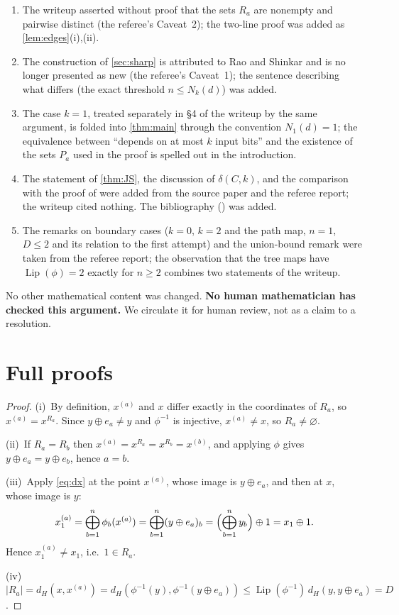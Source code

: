 \documentclass[11pt,a4paper]{article}
\theoremstyle{plain}
\theoremstyle{definition}
\theoremstyle{remark}
\newcommand{\dH}{d_H}
\newcommand{\Lip}{\operatorname{Lip}}
\begin{document}
\begin{enumerate}[label=(\alph*),nosep]
\item The writeup asserted without proof that the sets $R_a$ are nonempty and pairwise distinct (the referee's Caveat~2); the two-line proof was added as \cref{lem:edges}(i),(ii).
\item The construction of \cref{sec:sharp} is attributed to Rao and Shinkar \cite[Theorem~2 and Appendix~A]{RS18} and is no longer presented as new (the referee's Caveat~1); the sentence describing what differs (the exact threshold $n\le N_k(d)$) was added.
\item The case $k=1$, treated separately in \S4 of the writeup by the same argument, is folded into \cref{thm:main} through the convention $N_1(d)=1$; the equivalence between ``depends on at most $k$ input bits'' and the existence of the sets $P_a$ used in the proof is spelled out in the introduction.
\item The statement of \cref{thm:JS}, the discussion of $\delta(C,k)$, and the comparison with the proof of \cite{JS21} were added from the source paper and the referee report; the writeup cited nothing. The bibliography (\cite{JS21,RS18,Joh21,BS23}) was added.
\item The remarks on boundary cases ($k=0$, $k=2$ and the path map, $n=1$, $D\le2$ and its relation to the first attempt) and the union-bound remark were taken from the referee report; the observation that the tree maps have $\Lip(\phi)=2$ exactly for $n\ge2$ combines two statements of the writeup.
\end{enumerate}
No other mathematical content was changed.
\textbf{No human mathematician has checked this argument.} We circulate it for human review, not as a claim to a resolution.

\appendix

\section{Full proofs}\label{app:proofs}

\label{pf:edges}
\lemedges*
\begin{proof}
(i)~By definition, $x^{(a)}$ and $x$ differ exactly in the coordinates of $R_a$, so $x^{(a)}=x^{R_a}$. Since $y\oplus e_a\ne y$ and $\phi^{-1}$ is injective, $x^{(a)}\ne x$, so $R_a\ne\varnothing$.

(ii)~If $R_a=R_b$ then $x^{(a)}=x^{R_a}=x^{R_b}=x^{(b)}$, and applying $\phi$ gives $y\oplus e_a=y\oplus e_b$, hence $a=b$.

(iii)~Apply \eqref{eq:dx} at the point $x^{(a)}$, whose image is $y\oplus e_a$, and then at $x$, whose image is $y$:
\[
x^{(a)}_1=\bigoplus_{b=1}^n\phi_b(x^{(a)})=\bigoplus_{b=1}^n(y\oplus e_a)_b=\Bigl(\bigoplus_{b=1}^n y_b\Bigr)\oplus1=x_1\oplus1 .
\]
Hence $x^{(a)}_1\ne x_1$, i.e.\ $1\in R_a$.

(iv)~$|R_a|=\dH(x,x^{(a)})=\dH(\phi^{-1}(y),\phi^{-1}(y\oplus e_a))\le\Lip(\phi^{-1})\,\dH(y,y\oplus e_a)=D$.
\end{proof}
\end{document}
